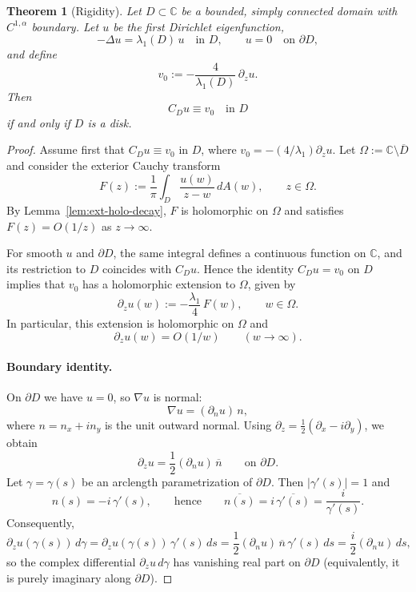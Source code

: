 \documentclass{amsart}
\newcommand{\C}{\mathbb{C}}
\theoremstyle{plain}
\newtheorem{theorem}{Theorem}
\theoremstyle{remark}
\begin{document}

\begin{theorem}[Rigidity]\label{thm:rigidity-disk}
Let $D \subset \C$ be a bounded, simply connected domain with $C^{1,\alpha}$ boundary.
Let $u$ be the first Dirichlet eigenfunction,
\[
-\Delta u=\lambda_1(D)\,u \quad \text{in } D, \qquad u=0 \quad \text{on } \partial D,
\]
and define
\[
v_0 := -\frac{4}{\lambda_1(D)}\,\partial_z u .
\]
Then
\[
C_D u \equiv v_0 \quad \text{in } D
\]
if and only if $D$ is a disk.
\end{theorem}

\begin{proof}
Assume first that $C_Du\equiv v_0$ in $D$, where $v_0=-(4/\lambda_1)\partial_z u$.
Let $\Omega:=\C\setminus\overline D$ and consider the exterior Cauchy transform
\[
F(z):=\frac{1}{\pi}\int_D \frac{u(w)}{z-w}\,dA(w),\qquad z\in\Omega.
\]
By Lemma~\ref{lem:ext-holo-decay}, $F$ is holomorphic on $\Omega$ and satisfies $F(z)=O(1/z)$ as $z\to\infty$.

For smooth $u$ and $\partial D$, the same integral defines a continuous function on $\C$, and its restriction
to $D$ coincides with $C_Du$. Hence the identity $C_Du=v_0$ on $D$ implies that $v_0$ has a holomorphic
extension to $\Omega$, given by
\[
\partial_z u(w) := -\frac{\lambda_1}{4}\,F(w),\qquad w\in\Omega.
\]
In particular, this extension is holomorphic on $\Omega$ and
\begin{equation}\label{eq:dz-decay}
\partial_z u(w)=O(1/w)\qquad (w\to\infty).
\end{equation}

\paragraph{Boundary identity.}
On $\partial D$ we have $u=0$, so $\nabla u$ is normal:
\[
\nabla u = (\partial_n u)\,n,
\]
where $n=n_x+i n_y$ is the unit outward normal. Using $\partial_z=\tfrac12(\partial_x-i\partial_y)$, we obtain
\[
\partial_z u
=\frac12(\partial_n u)\,\overline{n}
\qquad \text{on }\partial D.
\]
Let $\gamma=\gamma(s)$ be an arclength parametrization of $\partial D$. Then $|\gamma'(s)|=1$ and
\[
n(s)=-i\,\gamma'(s),
\qquad\text{hence}\qquad
\overline{n(s)}=i\,\overline{\gamma'(s)}=\frac{i}{\gamma'(s)}.
\]
Consequently,
\[
\partial_z u(\gamma(s))\,d\gamma
=\partial_z u(\gamma(s))\,\gamma'(s)\,ds
=\frac12(\partial_n u)\,\overline{n}\,\gamma'(s)\,ds
=\frac{i}{2}(\partial_n u)\,ds,
\]
so the complex differential $\partial_z u\,d\gamma$ has vanishing real part on $\partial D$
(equivalently, it is purely imaginary along $\partial D$).


\end{proof}
\end{document}
